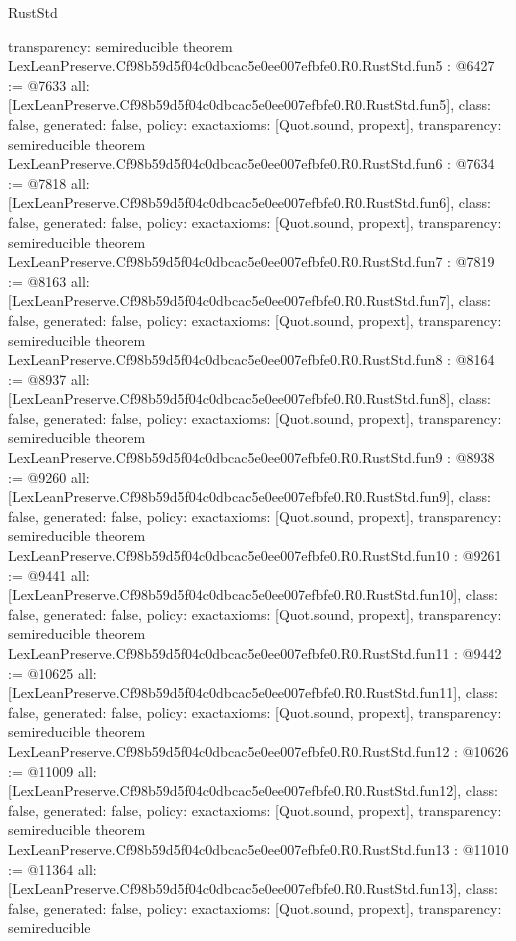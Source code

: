 \begin{lexlean}{RustStd}
\begin{coremodule}
{  transparency: semireducible
}
theorem LexLeanPreserve.Cf98b59d5f04c0dbcac5e0ee007efbfe0.R0.RustStd.fun5 : @6427 := @7633 {
  all: [LexLeanPreserve.Cf98b59d5f04c0dbcac5e0ee007efbfe0.R0.RustStd.fun5],
  class: false,
  generated: false,
  policy: exact{axioms: [Quot.sound, propext]},
  transparency: semireducible
}
theorem LexLeanPreserve.Cf98b59d5f04c0dbcac5e0ee007efbfe0.R0.RustStd.fun6 : @7634 := @7818 {
  all: [LexLeanPreserve.Cf98b59d5f04c0dbcac5e0ee007efbfe0.R0.RustStd.fun6],
  class: false,
  generated: false,
  policy: exact{axioms: [Quot.sound, propext]},
  transparency: semireducible
}
theorem LexLeanPreserve.Cf98b59d5f04c0dbcac5e0ee007efbfe0.R0.RustStd.fun7 : @7819 := @8163 {
  all: [LexLeanPreserve.Cf98b59d5f04c0dbcac5e0ee007efbfe0.R0.RustStd.fun7],
  class: false,
  generated: false,
  policy: exact{axioms: [Quot.sound, propext]},
  transparency: semireducible
}
theorem LexLeanPreserve.Cf98b59d5f04c0dbcac5e0ee007efbfe0.R0.RustStd.fun8 : @8164 := @8937 {
  all: [LexLeanPreserve.Cf98b59d5f04c0dbcac5e0ee007efbfe0.R0.RustStd.fun8],
  class: false,
  generated: false,
  policy: exact{axioms: [Quot.sound, propext]},
  transparency: semireducible
}
theorem LexLeanPreserve.Cf98b59d5f04c0dbcac5e0ee007efbfe0.R0.RustStd.fun9 : @8938 := @9260 {
  all: [LexLeanPreserve.Cf98b59d5f04c0dbcac5e0ee007efbfe0.R0.RustStd.fun9],
  class: false,
  generated: false,
  policy: exact{axioms: [Quot.sound, propext]},
  transparency: semireducible
}
theorem LexLeanPreserve.Cf98b59d5f04c0dbcac5e0ee007efbfe0.R0.RustStd.fun10 : @9261 := @9441 {
  all: [LexLeanPreserve.Cf98b59d5f04c0dbcac5e0ee007efbfe0.R0.RustStd.fun10],
  class: false,
  generated: false,
  policy: exact{axioms: [Quot.sound, propext]},
  transparency: semireducible
}
theorem LexLeanPreserve.Cf98b59d5f04c0dbcac5e0ee007efbfe0.R0.RustStd.fun11 : @9442 := @10625 {
  all: [LexLeanPreserve.Cf98b59d5f04c0dbcac5e0ee007efbfe0.R0.RustStd.fun11],
  class: false,
  generated: false,
  policy: exact{axioms: [Quot.sound, propext]},
  transparency: semireducible
}
theorem LexLeanPreserve.Cf98b59d5f04c0dbcac5e0ee007efbfe0.R0.RustStd.fun12 : @10626 := @11009 {
  all: [LexLeanPreserve.Cf98b59d5f04c0dbcac5e0ee007efbfe0.R0.RustStd.fun12],
  class: false,
  generated: false,
  policy: exact{axioms: [Quot.sound, propext]},
  transparency: semireducible
}
theorem LexLeanPreserve.Cf98b59d5f04c0dbcac5e0ee007efbfe0.R0.RustStd.fun13 : @11010 := @11364 {
  all: [LexLeanPreserve.Cf98b59d5f04c0dbcac5e0ee007efbfe0.R0.RustStd.fun13],
  class: false,
  generated: false,
  policy: exact{axioms: [Quot.sound, propext]},
  transparency: semireducible
}
\end{coremodule}
\end{lexlean}
